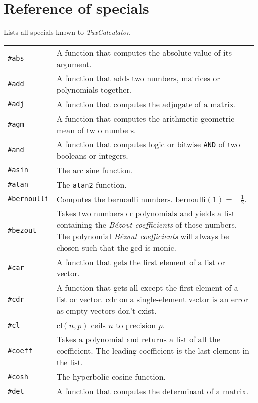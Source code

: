 \documentclass[10pt]{article}
\begin{document}
    \section{Reference of specials}\label{sec:reference-special}
    Lists all specials known to \textit{TuxCalculator}.
    \begin{longtable}{p{}p{}}
        \verb|#abs|       & A function that computes the absolute value of its argument. \\
        \verb|#add|       & A function that adds two numbers, matrices or polynomials together. \\
        \verb|#adj|       & A function that computes the adjugate of a matrix. \\
        \verb|#agm|       & A function that computes the arithmetic-geometric mean of tw o numbers. \\
        \verb|#and|       & A function that computes logic or bitwise \verb|AND| of two booleans or integers. \\
        \verb|#asin|      & The arc sine function. \\
        \verb|#atan|      & The \verb|atan2| function. \\
        \verb|#bernoulli| & Computes the bernoulli numbers. $ \mathrm{bernoulli}(1) = -\frac{1}{2} $. \\
        \verb|#bezout|    & Takes two numbers or polynomials and yields a list containing the \textsl{B\'ezout coefficients} of those numbers.
                            The polynomial \textsl{B\'ezout coefficients} will always be chosen such that the $ \mathrm{gcd} $ is monic. \\
        \verb|#car|       & A function that gets the first element of a list or vector. \\
        \verb|#cdr|       & A function that gets all except the first element of a list or vector.
                            $ \mathrm{cdr} $ on a single-element vector is an error as empty vectors don't exist. \\
        \verb|#cl|        & $ \mathrm{cl}(n,p) $ ceils $ n $ to precision $ p $. \\
        \verb|#coeff|     & Takes a polynomial and returns a list of all the coefficient.
                            The leading coefficient is the last element in the list. \\
        \verb|#cosh|      & The hyperbolic cosine function. \\
        \verb|#det|       & A function that computes the determinant of a matrix. \\

\end{longtable}
\end{document}
